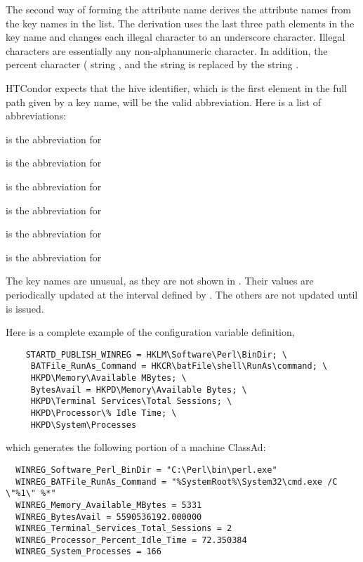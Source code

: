 \begin{description}
  The second way of forming the attribute name derives the attribute names
  from the key names in the list.
  The derivation uses the last three path elements in the key name and changes
  each illegal character to an underscore character.
  Illegal characters are essentially any non-alphanumeric character. 
  In addition, the percent character (\verb@%@) is replaced by the
  string ,
  and the string  is replaced by the string .

  HTCondor expects that the hive identifier, 
  which is the first element in the full path given by a key name,
  will be the valid abbreviation.
  Here is a list of abbreviations:
  \begin{description}
    \item {} is the abbreviation for  
    \item {} is the abbreviation for  
    \item {} is the abbreviation for  
    \item {} is the abbreviation for  
    \item {} is the abbreviation for  
    \item {} is the abbreviation for  
  \end{description}
  The  key names are unusual, 
  as they are not shown in .
  Their values are periodically updated at the interval defined by 
  . 
  The others are not updated until  is issued.

  Here is a complete example of the configuration variable definition,
\begin{verbatim}
    STARTD_PUBLISH_WINREG = HKLM\Software\Perl\BinDir; \
     BATFile_RunAs_Command = HKCR\batFile\shell\RunAs\command; \
     HKPD\Memory\Available MBytes; \
     BytesAvail = HKPD\Memory\Available Bytes; \
     HKPD\Terminal Services\Total Sessions; \
     HKPD\Processor\% Idle Time; \
     HKPD\System\Processes
\end{verbatim}
  which generates the following portion of a machine ClassAd: 
\begin{verbatim}
  WINREG_Software_Perl_BinDir = "C:\Perl\bin\perl.exe"
  WINREG_BATFile_RunAs_Command = "%SystemRoot%\System32\cmd.exe /C \"%1\" %*"
  WINREG_Memory_Available_MBytes = 5331
  WINREG_BytesAvail = 5590536192.000000
  WINREG_Terminal_Services_Total_Sessions = 2
  WINREG_Processor_Percent_Idle_Time = 72.350384
  WINREG_System_Processes = 166
\end{verbatim}


\end{description}
